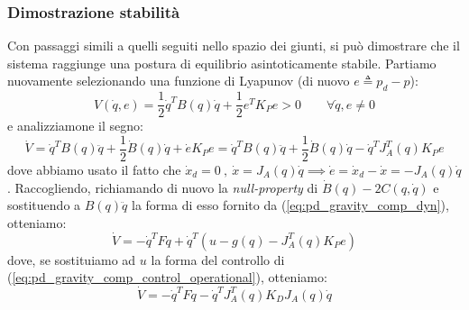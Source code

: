 \subsubsection{Dimostrazione stabilità}
Con passaggi simili a quelli seguiti nello spazio dei giunti, si può dimostrare che il sistema raggiunge una postura di equilibrio asintoticamente stabile.
Partiamo nuovamente selezionando una funzione di Lyapunov (di nuovo $e \triangleq p_d - p$):
$$
V(\dot{q}, e) = \frac{1}{2}\dot{q}^TB(q)\dot{q} + \frac{1}{2}e^TK_Pe > 0 \qquad \forall \dot{q},e \neq 0
$$
e analizziamone il segno:
$$
\dot{V} = \dot{q}^TB(q)\ddot{q} + \frac{1}{2}\dot{B}(q)\dot{q} + \dot{e}K_Pe = \dot{q}^TB(q)\ddot{q} + \frac{1}{2}\dot{B}(q)\dot{q} - \dot{q}^TJ_A^T(q)K_Pe
$$
dove abbiamo usato il fatto che $\dot{x}_d = 0 \ , \ \dot{x}=J_A(q)\dot{q} \implies \dot{e} = \dot{x}_d - \dot{x} = - J_A(q)\dot{q}$.
Raccogliendo, richiamando di nuovo la \textit{null-property} di $\dot{B}(q) - 2C(q, \dot{q})$ e sostituendo a $B(q)\ddot{q}$ la forma di esso fornito da (\ref{eq:pd_gravity_comp_dyn}), otteniamo:
$$
\dot{V} = -\dot{q}^TF\dot{q} + \dot{q}^T(u - g(q) - J_A^T(q)K_Pe)
$$
dove, se sostituiamo ad $u$ la forma del controllo di (\ref{eq:pd_gravity_comp_control_operational}), otteniamo:
$$
\dot{V} = -\dot{q}^TF\dot{q} - \dot{q}^TJ_A^T(q)K_DJ_A(q)\dot{q}
$$

